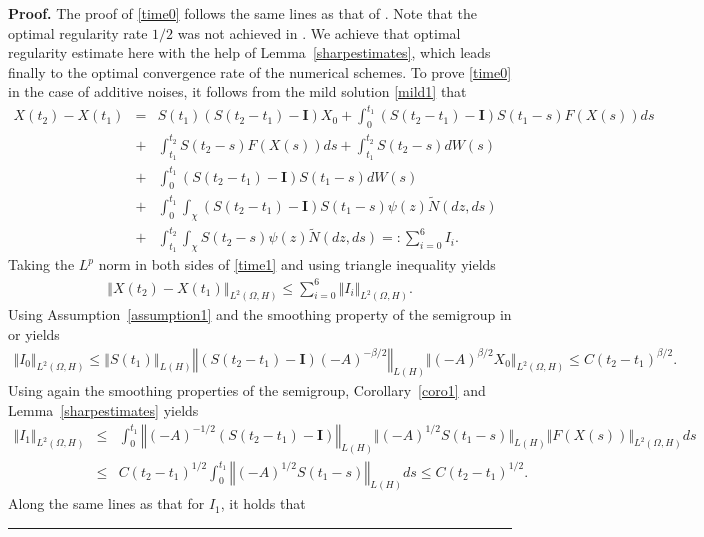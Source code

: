 \documentclass[review,12pt]{elsarticle}
\newenvironment{proof}[1][Proof]{\textbf{#1.} }{\hspace{\stretch{1}}\rule{0.5em}{0.5em}}
\newcommand{\lemref}[1]{{Lemma~\ref{#1}}}
\newcommand{\assref}[1]{{Assumption~\ref{#1}}}
\newcommand{\coref}[1]{{Corollary~\ref{#1}}}
\begin{document}
\begin{proof}
The proof of \eqref{time0} follows the same lines as that of \cite[Theorem 3.2]{Yang}. Note that the optimal regularity rate $1/2$ was not achieved in \cite{Yang}. We achieve that optimal regularity estimate here with the help of \lemref{sharpestimates}, which leads finally to the optimal convergence rate of the numerical schemes.  To prove \eqref{time0} in the case of additive noises, it follows from the mild solution \eqref{mild1} that
\begin{eqnarray}
\label{time1}
X(t_2)-X(t_1)
&=&S(t_1)\left (S(t_2-t_1)-\mathbf{I}\right)X_0+\int_0^{t_1}\left(S(t_2-t_1)-\mathbf{I}\right)S(t_1-s)F(X(s))ds\nonumber\\
&+&\int_{t_1}^{t_2}S(t_2-s)F(X(s))ds+\int_{t_1}^{t_2}S(t_2-s)dW(s)\nonumber\\
&+&\int_0^{t_1}(S(t_2-t_1)-\mathbf{I})S(t_1-s)dW(s)\nonumber\\
&+&\int_0^{t_1}\int_{\chi}(S(t_2-t_1)-\mathbf{I})S(t_1-s)\psi(z)\widetilde{N}(dz,ds)\nonumber\\
&+&\int_{t_1}^{t_2}\int_{\chi}S(t_2-s)\psi(z)\widetilde{N}(dz,ds)=:\sum_{i=0}^6I_i.
\end{eqnarray}
Taking the $L^p$ norm in both sides of \eqref{time1} and using triangle inequality yields
\begin{eqnarray}
\label{time2}
\left\Vert X(t_2)-X(t_1)\right\Vert_{L^2(\Omega, H)}\leq \sum_{i=0}^6\Vert I_i\Vert_{L^2(\Omega, H)}.
\end{eqnarray}
Using \assref{assumption1} and the smoothing property of the semigroup in \cite[Proposition 2.2]{Antonio1} or \cite{Henry} yields
\begin{eqnarray}
\label{time3}
\Vert I_0\Vert_{L^2(\Omega, H)}\leq\left\Vert S(t_1)\right\Vert_{L(H)}\left\Vert(S(t_2-t_1)-\mathbf{I})(-A)^{-\beta/2}\right\Vert_{L(H)}\Vert (-A)^{\beta/2}X_0\Vert_{L^2(\Omega, H)}\leq C(t_2-t_1)^{\beta/2}.
\end{eqnarray}
Using again the smoothing properties of the semigroup, \coref{coro1} and \lemref{sharpestimates} yields
\begin{eqnarray}
\label{time4}
\Vert I_1\Vert_{L^2(\Omega, H)}&\leq& \int_0^{t_1}\left\Vert (-A)^{-1/2}(S(t_2-t_1)-\mathbf{I})\right\Vert_{L(H)}\Vert (-A)^{1/2}S(t_1-s)\Vert_{L(H)}\Vert F(X(s))\Vert_{L^2(\Omega, H)}ds\nonumber\\
&\leq& C(t_2-t_1)^{1/2}\int_0^{t_1}\left\Vert (-A)^{1/2}S(t_1-s)\right\Vert_{L(H)}ds\leq C(t_2-t_1)^{1/2}.
\end{eqnarray}
Along the same lines as that for $I_1$, it holds that

\end{proof}
\end{document}
